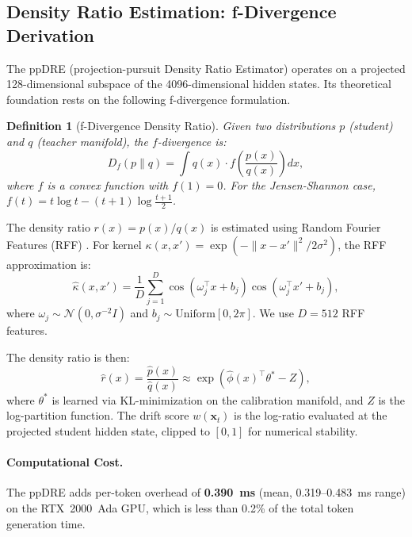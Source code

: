 \documentclass[twoside]{article}
\newtheorem{definition}{Definition}
\begin{document}
\subsection{Density Ratio Estimation: f-Divergence Derivation}
\label{app:ppdre}

The ppDRE (projection-pursuit Density Ratio Estimator) operates on a projected 128-dimensional subspace of the 4096-dimensional hidden states. Its theoretical foundation rests on the following f-divergence formulation.

\begin{definition}[f-Divergence Density Ratio]
Given two distributions $p$ (student) and $q$ (teacher manifold), the $f$-divergence is:
\begin{equation}
  D_f(p \| q) = \int q(x) \cdot f\!\left(\frac{p(x)}{q(x)}\right) dx,
\end{equation}
where $f$ is a convex function with $f(1) = 0$. For the Jensen-Shannon case, $f(t) = t \log t - (t+1)\log\frac{t+1}{2}$.
\end{definition}

The density ratio $r(x) = p(x)/q(x)$ is estimated using Random Fourier Features (RFF) . For kernel $\kappa(x, x') = \exp(-\|x-x'\|^2 / 2\sigma^2)$, the RFF approximation is:
\begin{equation}
  \hat{\kappa}(x, x') = \frac{1}{D} \sum_{j=1}^{D} \cos(\omega_j^\top x + b_j) \cos(\omega_j^\top x' + b_j),
\end{equation}
where $\omega_j \sim \mathcal{N}(0, \sigma^{-2} I)$ and $b_j \sim \text{Uniform}[0, 2\pi]$. We use $D = 512$ RFF features.

The density ratio is then:
\begin{equation}
  \hat{r}(x) = \frac{\hat{p}(x)}{\hat{q}(x)} \approx \exp\!\left(\hat{\phi}(x)^\top \theta^* - Z\right),
\end{equation}
where $\theta^*$ is learned via KL-minimization on the calibration manifold, and $Z$ is the log-partition function. The drift score $w(\mathbf{x}_t)$ is the log-ratio evaluated at the projected student hidden state, clipped to $[0, 1]$ for numerical stability.

\paragraph{Computational Cost.} The ppDRE adds per-token overhead of \textbf{0.390~ms} (mean, 0.319--0.483~ms range) on the RTX~2000~Ada GPU, which is less than 0.2\% of the total token generation time.
\end{document}
